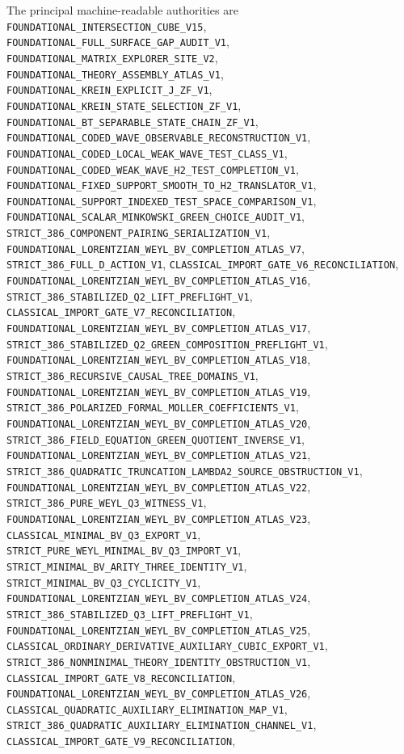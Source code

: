 \documentclass[11pt]{article}
\theoremstyle{definition}
\theoremstyle{remark}
\newcommand{\cert}[1]{\nolinkurl{#1}}
\begin{document}
The principal machine-readable authorities are
\cert{FOUNDATIONAL_INTERSECTION_CUBE_V15},
\cert{FOUNDATIONAL_FULL_SURFACE_GAP_AUDIT_V1},
\cert{FOUNDATIONAL_MATRIX_EXPLORER_SITE_V2},
\cert{FOUNDATIONAL_THEORY_ASSEMBLY_ATLAS_V1},
\cert{FOUNDATIONAL_KREIN_EXPLICIT_J_ZF_V1},
\cert{FOUNDATIONAL_KREIN_STATE_SELECTION_ZF_V1},
\cert{FOUNDATIONAL_BT_SEPARABLE_STATE_CHAIN_ZF_V1},
\cert{FOUNDATIONAL_CODED_WAVE_OBSERVABLE_RECONSTRUCTION_V1},
\cert{FOUNDATIONAL_CODED_LOCAL_WEAK_WAVE_TEST_CLASS_V1},
\cert{FOUNDATIONAL_CODED_WEAK_WAVE_H2_TEST_COMPLETION_V1},
\cert{FOUNDATIONAL_FIXED_SUPPORT_SMOOTH_TO_H2_TRANSLATOR_V1},
\cert{FOUNDATIONAL_SUPPORT_INDEXED_TEST_SPACE_COMPARISON_V1},
\cert{FOUNDATIONAL_SCALAR_MINKOWSKI_GREEN_CHOICE_AUDIT_V1},
\cert{STRICT_386_COMPONENT_PAIRING_SERIALIZATION_V1},
\cert{FOUNDATIONAL_LORENTZIAN_WEYL_BV_COMPLETION_ATLAS_V7},
\cert{STRICT_386_FULL_D_ACTION_V1},
\cert{CLASSICAL_IMPORT_GATE_V6_RECONCILIATION},
\cert{FOUNDATIONAL_LORENTZIAN_WEYL_BV_COMPLETION_ATLAS_V16},
\cert{STRICT_386_STABILIZED_Q2_LIFT_PREFLIGHT_V1},
\cert{CLASSICAL_IMPORT_GATE_V7_RECONCILIATION},
\cert{FOUNDATIONAL_LORENTZIAN_WEYL_BV_COMPLETION_ATLAS_V17},
\cert{STRICT_386_STABILIZED_Q2_GREEN_COMPOSITION_PREFLIGHT_V1},
\cert{FOUNDATIONAL_LORENTZIAN_WEYL_BV_COMPLETION_ATLAS_V18},
\cert{STRICT_386_RECURSIVE_CAUSAL_TREE_DOMAINS_V1},
\cert{FOUNDATIONAL_LORENTZIAN_WEYL_BV_COMPLETION_ATLAS_V19},
\cert{STRICT_386_POLARIZED_FORMAL_MOLLER_COEFFICIENTS_V1},
\cert{FOUNDATIONAL_LORENTZIAN_WEYL_BV_COMPLETION_ATLAS_V20},
\cert{STRICT_386_FIELD_EQUATION_GREEN_QUOTIENT_INVERSE_V1},
\cert{FOUNDATIONAL_LORENTZIAN_WEYL_BV_COMPLETION_ATLAS_V21},
\cert{STRICT_386_QUADRATIC_TRUNCATION_LAMBDA2_SOURCE_OBSTRUCTION_V1},
\cert{FOUNDATIONAL_LORENTZIAN_WEYL_BV_COMPLETION_ATLAS_V22},
\cert{STRICT_386_PURE_WEYL_Q3_WITNESS_V1},
\cert{FOUNDATIONAL_LORENTZIAN_WEYL_BV_COMPLETION_ATLAS_V23},
\cert{CLASSICAL_MINIMAL_BV_Q3_EXPORT_V1},
\cert{STRICT_PURE_WEYL_MINIMAL_BV_Q3_IMPORT_V1},
\cert{STRICT_MINIMAL_BV_ARITY_THREE_IDENTITY_V1},
\cert{STRICT_MINIMAL_BV_Q3_CYCLICITY_V1},
\cert{FOUNDATIONAL_LORENTZIAN_WEYL_BV_COMPLETION_ATLAS_V24},
\cert{STRICT_386_STABILIZED_Q3_LIFT_PREFLIGHT_V1},
\cert{FOUNDATIONAL_LORENTZIAN_WEYL_BV_COMPLETION_ATLAS_V25},
\cert{CLASSICAL_ORDINARY_DERIVATIVE_AUXILIARY_CUBIC_EXPORT_V1},
\cert{STRICT_386_NONMINIMAL_THEORY_IDENTITY_OBSTRUCTION_V1},
\cert{CLASSICAL_IMPORT_GATE_V8_RECONCILIATION},
\cert{FOUNDATIONAL_LORENTZIAN_WEYL_BV_COMPLETION_ATLAS_V26},
\cert{CLASSICAL_QUADRATIC_AUXILIARY_ELIMINATION_MAP_V1},
\cert{STRICT_386_QUADRATIC_AUXILIARY_ELIMINATION_CHANNEL_V1},
\cert{CLASSICAL_IMPORT_GATE_V9_RECONCILIATION},
\end{document}
